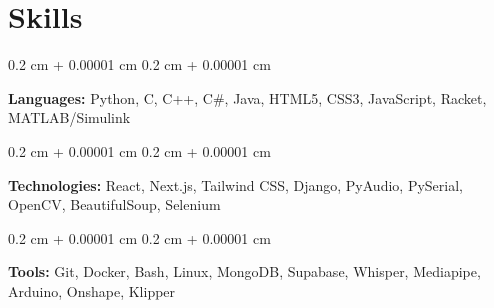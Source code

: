 \documentclass[10pt, letterpaper]{article}
\newenvironment{onecolentry}{
    \begin{adjustwidth}{
        0.2 cm + 0.00001 cm
    }{
        0.2 cm + 0.00001 cm
    }
}{
    \end{adjustwidth}
} %
\begin{document}
    \section{Skills}

        \begin{onecolentry}
            \textbf{Languages:} Python, C, C++, C\#, Java, HTML5, CSS3, JavaScript, Racket, MATLAB/Simulink
        \end{onecolentry}

        \vspace{0.1 cm}

        \begin{onecolentry}
            \textbf{Technologies:} React, Next.js, Tailwind CSS, Django, PyAudio, PySerial, OpenCV, BeautifulSoup, Selenium \end{onecolentry}

        \vspace{0.1 cm}

        \begin{onecolentry}
            \textbf{Tools:} Git, Docker, Bash, Linux, MongoDB, Supabase, Whisper, Mediapipe, Arduino, Onshape, Klipper\end{onecolentry}
\end{document}
